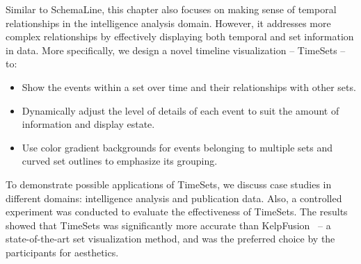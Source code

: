 Similar to SchemaLine, this chapter also focuses on making sense of temporal relationships in the intelligence analysis domain. However, it addresses more complex relationships by effectively displaying both temporal and set information in data. More specifically, we design a novel timeline visualization -- TimeSets -- to:

\begin{itemize}
	\item Show the events within a set over time and their relationships with other sets.
	\item Dynamically adjust the level of details of each event to suit the amount of information and display estate.
	\item Use color gradient backgrounds for events belonging to multiple sets and curved set outlines to emphasize its grouping.
\end{itemize}

To demonstrate possible applications of TimeSets, we discuss case studies in different domains: intelligence analysis and publication data. Also, a controlled experiment was conducted to evaluate the effectiveness of TimeSets. The results showed that TimeSets was significantly more accurate than KelpFusion~\cite{Meulemans2013} -- a state-of-the-art set visualization method, and was the preferred choice by the participants for aesthetics.